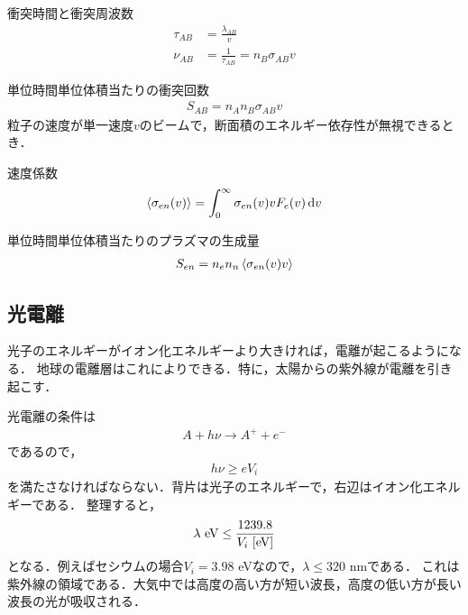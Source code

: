\documentclass{report}
\begin{document}
\begin{itembox}[l]{衝突時間と衝突周波数}
  \begin{align}
    \tau_{AB} &= \frac{\lambda_{AB}}{v}\\
    \nu_{AB} &= \frac{1}{\tau_{AB}} = n_B \sigma_{AB} v
  \end{align}
\end{itembox}

\begin{itembox}[l]{単位時間単位体積当たりの衝突回数}
  \begin{align}
    S_{AB} = n_A n_B \sigma_{AB} v
  \end{align}
  粒子の速度が単一速度$v$のビームで，断面積のエネルギー依存性が無視できるとき．
\end{itembox}

\begin{itembox}[l]{速度係数}
  \begin{align}
    \ev{\sigma_{en}(v)} = \int_0^{\infty} \sigma_{en}(v)vF_e(v)\dd{v}
  \end{align}
\end{itembox}

\begin{itembox}[l]{単位時間単位体積当たりのプラズマの生成量}
  \begin{align}
    S_{en} = n_e n_n \ev{\sigma_{en}(v)v}
  \end{align}
\end{itembox}

\subsection{光電離}
光子のエネルギーがイオン化エネルギーより大きければ，電離が起こるようになる．
地球の電離層はこれによりできる．特に，太陽からの紫外線が電離を引き起こす．

光電離の条件は
\begin{align}
  A + h\nu \rightarrow A^+ + e^-
\end{align}
であるので，
\begin{align}
  h\nu \geq e V_i
\end{align}
を満たさなければならない．背片は光子のエネルギーで，右辺はイオン化エネルギーである．
整理すると，
\begin{align}
  \lambda\ \mathrm{eV} \leq \frac{1239.8}{V_i\ [\mathrm{eV}]}
\end{align}
となる．例えばセシウムの場合$V_i = 3.98$ eVなので，$\lambda \leq 320$ nmである．
これは紫外線の領域である．大気中では高度の高い方が短い波長，高度の低い方が長い波長の光が吸収される．
\end{document}
